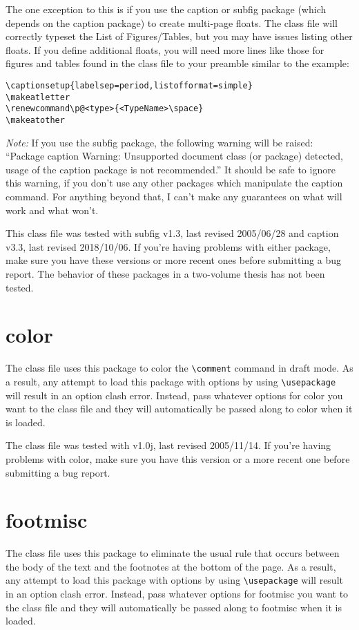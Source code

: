 The one exception to this is if you use the caption or subfig package (which depends on the caption package) to create multi-page floats. The class file will correctly typeset the List of Figures/Tables, but you may have issues listing other floats. If you define additional floats, you will need more lines like those for figures and tables found in the class file to your preamble similar to the example:
\begin{verbatim}
\captionsetup{labelsep=period,listofformat=simple}
\makeatletter
\renewcommand\p@<type>{<TypeName>\space}
\makeatother
\end{verbatim}

\emph{Note:} If you use the subfig package, the following warning will be raised: ``Package caption Warning: Unsupported document class (or package) detected, usage of the caption package is not recommended.''  It should be safe to ignore this warning, if you don't use any other packages which manipulate the caption command.  For anything beyond that, I can't make any guarantees on what will work and what won't.

This class file was tested with subfig v1.3, last revised 2005/06/28 and caption v3.3, last revised 2018/10/06.  If you're having problems with either package, make sure you have these versions or more recent ones before submitting a bug report.  The behavior of these packages in a two-volume thesis has not been tested.

\section{color}
The class file uses this package to color the \verb=\comment= command in draft mode.  As a result, any attempt to load this package with options by using \verb=\usepackage= will result in an option clash error.  Instead, pass whatever options for color you want to the class file and they will automatically be passed along to color when it is loaded.

The class file was tested with v1.0j, last revised 2005/11/14.  If you're having problems with color, make sure you have this version or a more recent one before submitting a bug report.

\section{footmisc}
The class file uses this package to eliminate the usual rule that occurs between the body of the text and the footnotes at the bottom of the page.  As a result, any attempt to load this package with options by using \verb=\usepackage= will result in an option clash error.  Instead, pass whatever options for footmisc you want to the class file and they will automatically be passed along to footmisc when it is loaded.

